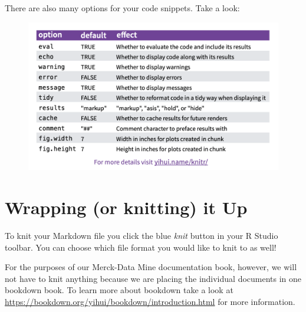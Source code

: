 \documentclass[]{book}
\begin{document}
There are also many options for your code snippets. Take a look:

\begin{figure}
\centering
\includegraphics{images/options.png}
\caption{}
\end{figure}

\section{Wrapping (or knitting) it Up}\label{wrapping-or-knitting-it-up}

To knit your Markdown file you click the blue \emph{knit} button in your
R Studio toolbar. You can choose which file format you would like to
knit to as well!

For the purposes of our Merck-Data Mine documentation book, however, we
will not have to knit anything because we are placing the individual
documents in one bookdown book. To learn more about bookdown take a look
at \url{https://bookdown.org/yihui/bookdown/introduction.html} for more
information.
\end{document}
